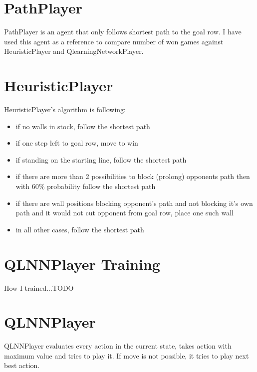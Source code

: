 
\section{PathPlayer}
PathPlayer is an agent that only follows shortest path to the goal row. I have
used this agent as a reference to compare number of won games against
HeuristicPlayer and QlearningNetworkPlayer.

\section{HeuristicPlayer}
HeuristicPlayer's algorithm is following:
\begin{itemize}
  \vspace*{-0.25cm}
  \setlength\itemsep{-0.15cm}

  \item if no walls in stock, follow the shortest path
  \item if one step left to goal row, move to win
  \item if standing on the starting line, follow the shortest path
  \item if there are more than 2 possibilities to block (prolong) opponents
        path then with $60\%$ probability follow the shortest path
  \item if there are wall positions blocking opponent's path and not
        blocking it's own path and it would not cut opponent from goal row,
        place one such wall
  \item in all other cases, follow the shortest path

  \vspace*{-0.25cm}
\end{itemize}

\section{QLNNPlayer Training}
How I trained...TODO

\section{QLNNPlayer}
QLNNPlayer evaluates every action in the current state, takes action
with maximum value and tries to play it. If move is not possible, it tries to
play next best action.
